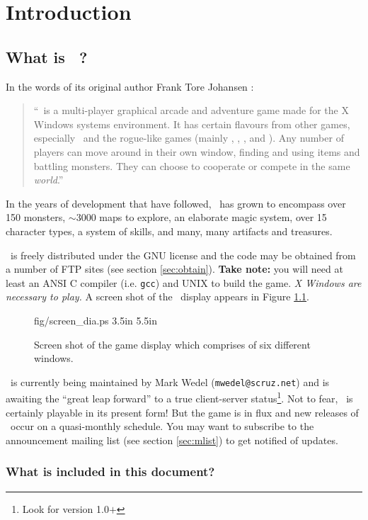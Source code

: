 
\chapter{Introduction}

\section{What is \cf\ ? }
 
In the words of its original author Frank Tore Johansen :
\begin{quote}
``\cf\ is a multi-player graphical arcade and adventure game made for the
X Windows systems environment. It has certain flavours from other games,
especially \gauntlet\ and the rogue-like  games (mainly \hack , \moria ,
\angband , and \ragnarok ). Any number of players can move around in their
own window, finding and using items and battling monsters. They can
choose to cooperate or compete in the same {\em world}.'' 
\end{quote}
In the years of development that have followed, \cf\ has grown to 
encompass over 150 monsters, $\sim$3000 maps to explore, an elaborate
magic system, over 15 character types, a system of skills, and
many, many artifacts and treasures. 

\cf\ is freely distributed under the GNU license and the code may be
obtained from a number of FTP sites (see section \ref{sec:obtain}).
{\bf Take note:} you will need at least an ANSI C compiler (i.e. {\tt gcc}) 
and UNIX to build the game.  {\em X Windows are necessary to play.} 
A screen shot of the \cf\ display appears in Figure \ref{fig:dis}.

\begin{figure}   
\mongovaryboth fig/screen_dia.ps 3.5in 5.5in
\caption{Screen shot of the game display which comprises of six
different windows. \label{fig:dis}}
\end{figure}

\cf\ is currently being maintained by Mark Wedel ({\tt mwedel@scruz.net})
and is awaiting the ``great leap forward'' to a true client-server
status\footnote{Look for version 1.0$+$}. Not to fear, \cf\ is certainly 
playable in its present form!
But the game is in flux and new releases of \cf\ occur on a quasi-monthly
schedule. You may want to subscribe to the announcement mailing list
(see section \ref{sec:mlist}) to get notified of updates.

\subsection{What is included in this document?}  

